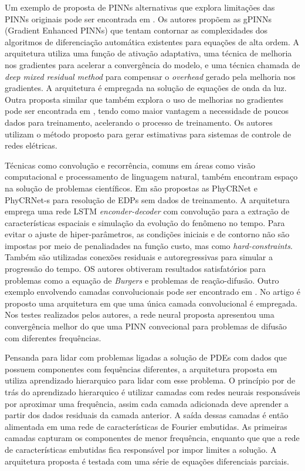 Um exemplo de proposta de PINNs alternativas que explora limitações das PINNs 
originais pode ser encontrada em \cite{sun-e-feng:2023-gPINNs}.
Os autores propõem as gPINNs (Gradient Enhanced PINNs) que tentam contornar as 
complexidades dos algoritmos de diferenciação automática existentes para equações de alta 
ordem. A arquitetura utiliza uma função de ativação adaptativa, uma técnica de 
melhoria nos gradientes para acelerar a convergência do modelo, e uma técnica 
chamada de \textit{deep mixed residual method} para compensar o \textit{overhead}
gerado pela melhoria nos gradientes. A arquitetura é empregada na solução de 
equações de onda da luz.
Outra proposta similar que também explora o uso de melhorias no gradientes pode 
ser encontrada em \cite{mohammadian-etal:2023-gradient-enhanced}, tendo como
maior vantagem a necessidade de poucos dados para treinamento, acelerando o processo
de treinamento.
Os autores utilizam o método proposto para gerar estimativas para sistemas de 
controle de redes elétricas.  

Técnicas como convolução e recorrência, comuns em áreas como visão computacional 
e processamento de linguagem natural, também encontram espaço na solução de problemas
científicos. Em \cite{ren-etal:2022-phycrnet} são propostas as PhyCRNet e PhyCRNet-s
para resolução de EDPs sem dados de treinamento. A arquitetura emprega uma rede
LSTM \textit{enconder-decoder} com convolução para a extração de características
espaciais e simulação da evolução do fenômeno no tempo.
Para evitar o ajuste de hiper-parâmetros, as condições iniciais e de contorno não
são impostas por meio de penaliadades na função custo, mas como \textit{hard-constraints}.
Também são utilizadas conexões residuais e autoregressivas para simular a progressão
do tempo. OS autores obtiveram resultados satisfatórios para problemas como a 
equação de \textit{Burgers} e problemas de reação-difusão.
Outro exemplo envolvendo camadas convolucionais pode ser encontrado em 
\cite{shi-etal:24-convnet}. No artigo é proposto uma arquitetura em que uma única 
camada convolucional é empregada. Nos testes realizados pelos autores, a rede 
neural proposta apresentou uma convergência melhor do que uma PINN convecional 
para problemas de difusão com diferentes frequências.

Pensanda para lidar com problemas ligadas a solução de PDEs com dados que possuem 
componentes com fequências diferentes, a arquitetura proposta em \cite{han-etal:2023-hierarchical-learning}
utiliza aprendizado hierarquico para lidar com esse problema.
O princípio por de trás do aprendizado hierarquico é utilizar camadas com redes
neurais responsáveis por aproximar uma frequência, assim cada camada 
adicionada deve aprender a partir dos dados residuais da camada anterior.
A saída dessas camadas é então alimentada em uma rede de características de Fourier
embutidas. 
As primeiras camadas capturam os componentes de menor frequência, enquanto que
que a rede de características embutidas fica responsável por impor limites a solução.
A arquitetura proposta é testada com uma série de equações diferenciais parciais.

